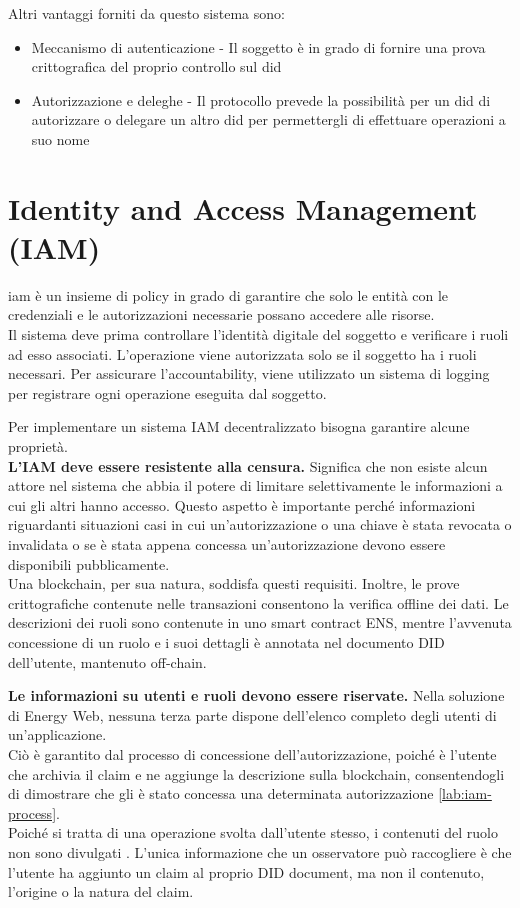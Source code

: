 Altri vantaggi forniti da questo sistema sono:
\begin{itemize}
    \item Meccanismo di autenticazione - Il soggetto è in grado di fornire una prova crittografica del proprio controllo sul \gls{did}
    \item Autorizzazione e deleghe -  Il protocollo prevede la possibilità per un \gls{did} di autorizzare o delegare un altro \gls{did} per permettergli di effettuare operazioni a suo nome
\end{itemize}

\section{Identity and Access Management (IAM)}
\gls{iam} è un insieme di policy in grado di garantire che solo le entità con le credenziali e le autorizzazioni necessarie possano accedere alle risorse. \\
Il sistema deve prima controllare l'identità digitale del soggetto e verificare i ruoli ad esso associati.
L'operazione viene autorizzata solo se il soggetto ha i ruoli necessari.
Per assicurare l'accountability, viene utilizzato un sistema di logging per registrare ogni operazione eseguita dal soggetto.

Per implementare un sistema IAM decentralizzato bisogna garantire alcune proprietà. \\

\textbf{L'IAM deve essere resistente alla censura.}
Significa che non esiste alcun attore nel sistema che abbia il potere di limitare selettivamente le informazioni a cui gli altri hanno accesso.
Questo aspetto è importante perché informazioni riguardanti situazioni casi in cui un'autorizzazione o una chiave è stata revocata o invalidata o se è stata appena concessa un'autorizzazione devono essere disponibili pubblicamente. \\
Una blockchain, per sua natura, soddisfa questi requisiti. Inoltre, le prove crittografiche contenute nelle transazioni consentono la verifica offline dei dati.
Le descrizioni dei ruoli sono contenute in uno smart contract ENS, mentre l'avvenuta concessione di un ruolo e i suoi dettagli è annotata nel documento DID dell'utente, mantenuto off-chain.

\textbf{Le informazioni su utenti e ruoli devono essere riservate.}
Nella soluzione di Energy Web, nessuna terza parte dispone dell'elenco completo degli utenti di un'applicazione. \\
Ciò è garantito dal processo di concessione dell'autorizzazione, poiché è l'utente che archivia il claim e ne aggiunge la descrizione sulla blockchain, consentendogli di dimostrare che gli è stato concessa una determinata autorizzazione \autoref{lab:iam-process}. \\
Poiché si tratta di una operazione svolta dall'utente stesso, i contenuti del ruolo non sono divulgati \cite{img:iam}.
L'unica informazione che un osservatore può raccogliere è che l'utente ha aggiunto un claim al proprio DID document, ma non il contenuto, l'origine o la natura del claim. \\

